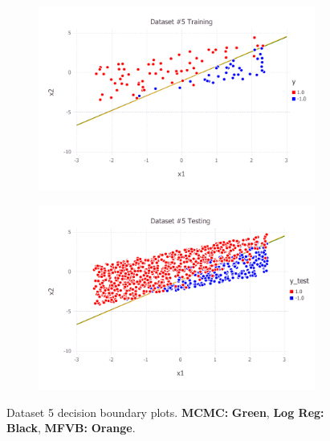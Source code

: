 \begin{figure}[h!]
\centering
    \begin{subfigure}[b]{0.45\textwidth}
	\includegraphics[scale=0.6]{figures/train_final_5.pdf}
    \end{subfigure}
    \quad
    \begin{subfigure}[b]{0.45\textwidth}
	\includegraphics[scale=0.6]{figures/test_final_5.pdf}
	\end{subfigure}
 \caption{Dataset 5 decision boundary plots.  {\bf MCMC:}  {\bf \color{ao(english)} Green}, {\bf Log Reg:} {\bf \color{black} Black}, {\bf MFVB:}  {\bf \color{burntorange} Orange}.}  \label{fig:dataset_5}  
\end{figure}
